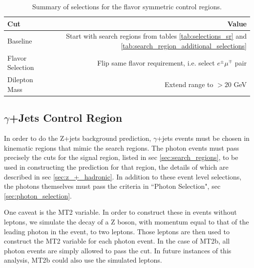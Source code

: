     \begin{table}[htb]
    \begin{center}
      \caption{\label{tab:flavor_symmetric_control_regions} 
        Summary of selections for the flavor symmetric control regions.
      }
      \begin{tabular}{l|r}\hline
      Cut & Value \\
      \hline 
      \hline
      Baseline                      & Start with search regions from tables \ref{tab:selections_sr} and \ref{tab:search_region_additional_selections}  \\
      Flavor Selection              & Flip same flavor requirement, i.e. select $e^\pm\mu^\mp$ pair \\
      Dilepton Mass                 & Extend range to $>20$ GeV \\
      \hline
      \hline
      \end{tabular}
    \end{center}
  \end{table} 

  \subsection{$\gamma$+Jets Control Region} \label{sec:met_templates_control_region}

    In order to do the Z+jets background prediction, $\gamma$+jets events must be chosen in kinematic regions that mimic the search regions. The photon events must pass precisely the cuts for the signal region, listed in sec \ref{sec:search_regions}, to be used in constructing the prediction for that region, the details of which are described in sec \ref{sec:z_+_hadronic}. In addition to these event level selections, the photons themselves must pass the criteria in ``Photon Selection", sec \ref{sec:photon_selection}.

    One caveat is the MT2 variable. In order to construct these in events without leptons, we simulate the decay of a Z boson, with momentum equal to that of the leading photon in the event, to two leptons. Those leptons are then used to construct the MT2 variable for each photon event. In the case of MT2b, all photon events are simply allowed to pass the cut. In future instances of this analysis, MT2b could also use the simulated leptons.


